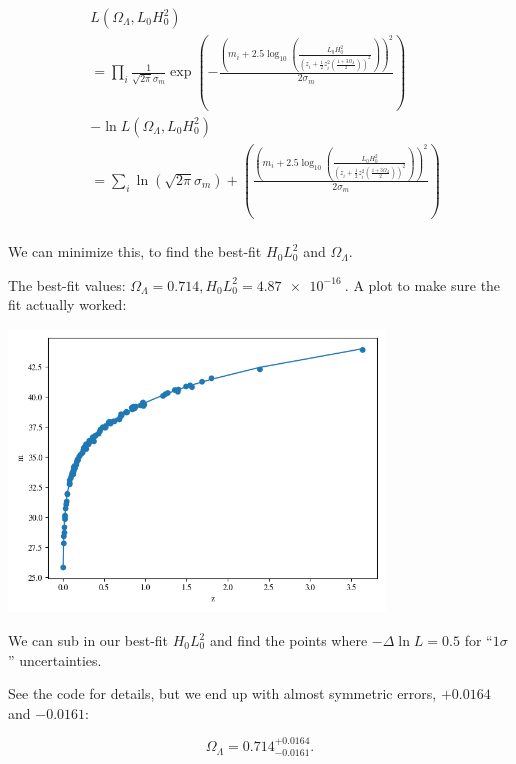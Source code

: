 \begin{enumerate}[label=\textbf{\Alph*}.]
    \begin{align*}
        &L(\Omega_\Lambda, L_0H_0^2) \\
        &= \prod_i \frac{1}{\sqrt{2\pi}\sigma_m} \exp\left(-\frac{\left(m_i + 2.5\log_{10}\left(\frac{L_0H_0^2}{\left(z_i + \frac{1}{2}z_i^2 (\frac{1 +3 \Omega_\Lambda}{2})\right)^2}\right)\right)^2}{2\sigma_m}\right) \\
        &-\ln L(\Omega_\Lambda, L_0H_0^2) \\
        &= \sum_i \ln(\sqrt{2\pi}\sigma_m) + \left(\frac{\left(m_i + 2.5\log_{10}\left(\frac{L_0H_0^2}{\left(z_i + \frac{1}{2}z_i^2 (\frac{1 +3 \Omega_\Lambda}{2})\right)^2}\right)\right)^2}{2\sigma_m}\right) \\
    \end{align*}

    We can minimize this, to find the best-fit $H_0L_0^2$ and $\Omega_\Lambda$.

    The best-fit values: $\Omega_\Lambda = 0.714, H_0L_0^2 = \SI{4.87e-16}{}$. A plot to make sure the fit actually worked:

    \begin{center}
        \includegraphics[width=0.75\textwidth]{q3_a_fit.png}
    \end{center}

    We can sub in our best-fit $H_0L_0^2$ and find the points where $-\Delta \ln L = 0.5$ for ``$1\sigma$'' uncertainties.

    See the code for details, but we end up with almost symmetric errors, $+0.0164$ and $-0.0161$:

    $$\Omega_\Lambda = 0.714^{+0.0164}_{-0.0161}.$$


\end{enumerate}
